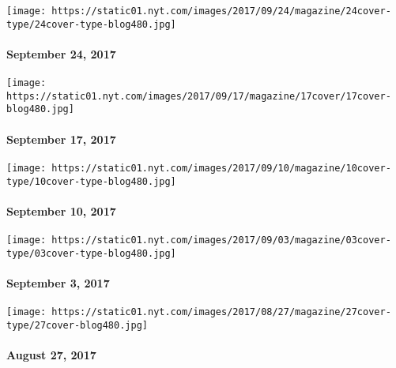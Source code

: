\href{https://www.nytimes.com/interactive/2017/09/21/magazine/voyages-issue-photographs-family-vacations-around-world.html}{}

\texttt{[image: https://static01.nyt.com/images/2017/09/24/magazine/24cover-type/24cover-type-blog480.jpg]}

\hypertarget{september-24-2017}{%
\paragraph{September 24, 2017}\label{september-24-2017}}

\href{https://www.nytimes.com/issue/magazine/2017/09/15/91717-issue}{}

\texttt{[image: https://static01.nyt.com/images/2017/09/17/magazine/17cover/17cover-blog480.jpg]}

\hypertarget{september-17-2017}{%
\paragraph{September 17, 2017}\label{september-17-2017}}

\href{https://www.nytimes.com/issue/magazine/2017/09/08/91017-issue}{}

\texttt{[image: https://static01.nyt.com/images/2017/09/10/magazine/10cover-type/10cover-type-blog480.jpg]}

\hypertarget{september-10-2017}{%
\paragraph{September 10, 2017}\label{september-10-2017}}

\href{https://www.nytimes.com/issue/magazine/2017/09/01/90317-issue}{}

\texttt{[image: https://static01.nyt.com/images/2017/09/03/magazine/03cover-type/03cover-type-blog480.jpg]}

\hypertarget{september-3-2017}{%
\paragraph{September 3, 2017}\label{september-3-2017}}

\href{https://www.nytimes.com/issue/magazine/2017/08/25/the-82717-issue}{}

\texttt{[image: https://static01.nyt.com/images/2017/08/27/magazine/27cover-type/27cover-blog480.jpg]}

\hypertarget{august-27-2017}{%
\paragraph{August 27, 2017}\label{august-27-2017}}

